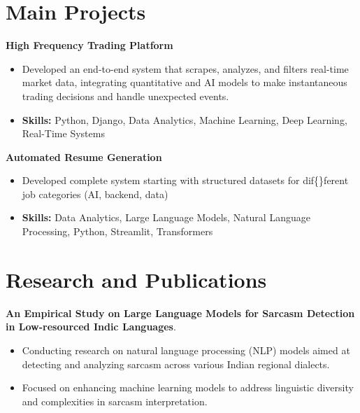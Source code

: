 \documentclass[a4paper,11pt]{article}
\begin{document}
\section{\textbf{Main Projects}}

\vspace{1mm}
  \textbf{High Frequency Trading Platform  }
\vspace{-1.5mm} %
\begin{itemize}
  \item Developed an end-to-end system that scrapes, analyzes, and filters real-time market data, integrating quantitative and AI models to make instantaneous trading decisions and handle unexpected events.
\vspace{-3mm}
  \item \textbf{Skills:} Python, Django, Data Analytics, Machine Learning, Deep Learning, Real-Time Systems
\end{itemize}


\vspace{1mm}
   \textbf{Automated Resume Generation }
\vspace{-1.5mm} %
\begin{itemize}
  \item Developed complete system starting with structured datasets for dif\{\}ferent job categories (AI, backend, data)
\vspace{-3mm}
  \item \textbf{Skills:} Data Analytics, Large Language Models, Natural Language Processing, Python, Streamlit, Transformers
\end{itemize}



\section{\textbf{Research and Publications} \hfill }
\vspace{1mm}
  \textbf{An Empirical Study on Large Language Models for Sarcasm Detection in Low-resourced Indic Languages}.
\vspace{-1mm} %
\begin{itemize}
  \item Conducting research on natural language processing (NLP) models aimed at detecting and analyzing sarcasm across various Indian regional dialects.
\vspace{-3mm}
  \item Focused on enhancing machine learning models to address linguistic diversity and complexities in sarcasm interpretation.
\end{itemize}
\end{document}

